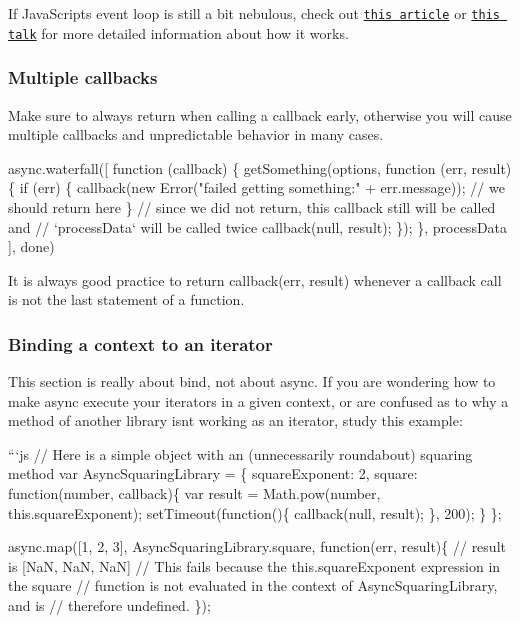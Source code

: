 If Java\+Script\textquotesingle{}s event loop is still a bit nebulous, check out \href{http://blog.carbonfive.com/2013/10/27/the-javascript-event-loop-explained/}{\tt this article} or \href{http://2014.jsconf.eu/speakers/philip-roberts-what-the-heck-is-the-event-loop-anyway.html}{\tt this talk} for more detailed information about how it works.

\subsubsection*{Multiple callbacks}

Make sure to always {\ttfamily return} when calling a callback early, otherwise you will cause multiple callbacks and unpredictable behavior in many cases.


\begin{DoxyCode}
async.waterfall([
    function (callback) \{
        getSomething(options, function (err, result) \{
          if (err) \{
            callback(new Error("failed getting something:" + err.message));
            // we should return here
          \}
          // since we did not return, this callback still will be called and
          // `processData` will be called twice
          callback(null, result);
        \});
    \},
    processData
], done)
\end{DoxyCode}


It is always good practice to {\ttfamily return callback(err, result)} whenever a callback call is not the last statement of a function.

\subsubsection*{Binding a context to an iterator}

This section is really about {\ttfamily bind}, not about {\ttfamily async}. If you are wondering how to make {\ttfamily async} execute your iterators in a given context, or are confused as to why a method of another library isn\textquotesingle{}t working as an iterator, study this example\+:

```js // Here is a simple object with an (unnecessarily roundabout) squaring method var Async\+Squaring\+Library = \{ square\+Exponent\+: 2, square\+: function(number, callback)\{ var result = Math.\+pow(number, this.\+square\+Exponent); set\+Timeout(function()\{ callback(null, result); \}, 200); \} \};

async.\+map(\mbox{[}1, 2, 3\mbox{]}, Async\+Squaring\+Library.\+square, function(err, result)\{ // result is \mbox{[}NaN, NaN, NaN\mbox{]} // This fails because the {\ttfamily this.\+square\+Exponent} expression in the square // function is not evaluated in the context of Async\+Squaring\+Library, and is // therefore undefined. \});

